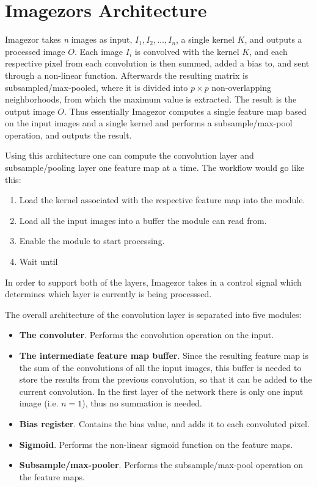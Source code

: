 \section{Imagezors Architecture}


Imagezor takes \textit{n} images as input, $ I_1, I_2, \dots, I_n $, a single kernel $ K $, and outputs a processed image $ O $.  Each image $ I_i $ is convolved with the kernel $ K $, and each respective pixel from each convolution is then summed, added a bias to, and sent through a non-linear function. Afterwards the resulting matrix is subsampled/max-pooled, where it is divided into $ p \times p $ non-overlapping neighborhoods, from which the maximum value is extracted. The result is the output image $ O $. Thus essentially Imagezor computes a single feature map based on the input images and a single kernel and performs a subsample/max-pool operation, and outputs the result. 

Using this architecture one can compute the convolution layer and subsample/pooling layer one feature map at a time. The workflow would go like this:

\begin{enumerate}
	\item Load the kernel associated with the respective feature map into the module.
	\item Load all the input images into a buffer the module can read from.
	\item Enable the module to start processing.
	\item Wait until 
\end{enumerate}


In order to support both of the layers, Imagezor takes in a control signal which determines which layer is currently is being processsed. 

The overall architecture of the convolution layer is separated into five modules:

\begin{itemize}
	\item \textbf{The convoluter}. Performs the convolution operation on the input.
	\item \textbf{The intermediate feature map buffer}. Since the resulting feature map is the sum of the convolutions of all the input images, this buffer is needed to store the results from the previous convolution, so that it can be added to the current convolution. In the first layer of the network there is only one input image (i.e. $ n = 1 $), thus no summation is needed.
	\item \textbf{Bias register}. Contains the bias value, and adds it to each convoluted pixel. 
	\item \textbf{Sigmoid}. Performs the non-linear sigmoid function  on the feature maps.
	\item \textbf{Subsample/max-pooler}. Performs the subsample/max-pool operation on the feature maps. 
\end{itemize}

